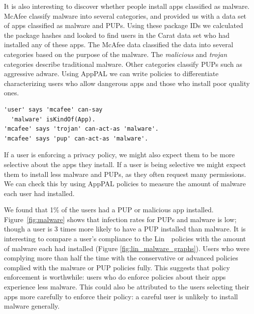 \documentclass[thesis.tex]{subfiles}
\begin{document}
It is also interesting to discover whether people install apps classified
as malware.  McAfee classify malware into several categories, and
provided us with a data set of apps classified as malware and
\acp{PUP}. Using these package IDs we calculated the package hashes
and looked to find users in the Carat data set who had installed any of
these apps.  The McAfee data classified the data into several
categories based on the purpose of the malware.  The \emph{malicious}
and \emph{trojan} categories describe traditional malware.  Other
categories classify \acp{PUP} such as aggressive adware.  Using AppPAL
we can write policies to differentiate characterizing users who allow
dangerous apps and those who install poor quality ones.

\begin{lstlisting}
'user' says 'mcafee' can-say
  'malware' isKindOf(App).
'mcafee' says 'trojan' can-act-as 'malware'.
'mcafee' says 'pup' can-act-as 'malware'.
\end{lstlisting}

If a user is enforcing a privacy policy, we might also expect them to
be more selective about the apps they install.  If a user is being
selective we might expect them to install less malware and \acp{PUP},
as they often request many permissions. We can check this by using
AppPAL policies to measure the amount of malware each user had
installed.


We found that 1\% of the users had a \ac{PUP} or malicious app
installed.  Figure~\ref{fig:malware} shows that infection rates for
\acp{PUP} and malware is low; though a user is 3 times more likely to
have a \ac{PUP} installed than malware.  It is interesting to compare
a user's compliance to the Lin~\etal~policies with the amount of
malware each had installed (Figure \autoref{fig:lin_malware_graphs}).
Users who were complying more than half the time with the conservative
or advanced policies complied with the malware or \ac{PUP} policies
fully.  This suggests that policy enforcement is worthwhile: users who
do enforce policies about their apps experience less malware.  This
could also be attributed to the users selecting their apps more
carefully to enforce their policy: a careful user is unlikely to
install malware generally.
\end{document}
